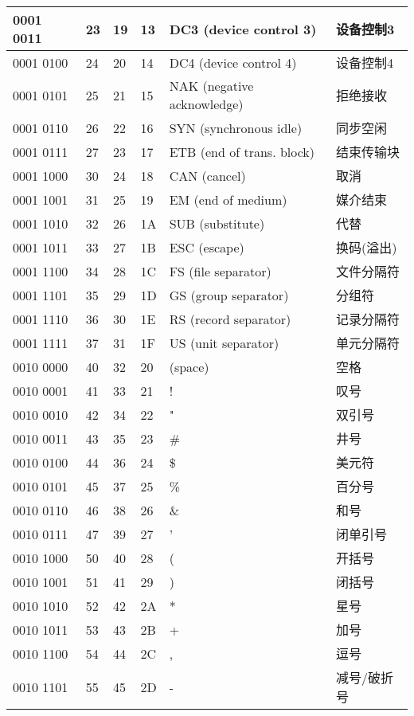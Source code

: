 \begin{longtable}{| p{.10\linewidth} | p{.08\linewidth} | p{.08\linewidth} | p{.10\linewidth} | p{.28\linewidth} | p{.15\linewidth} |}
0001 0011 & 23 & 19 & 13 & DC3 (device control 3) & 设备控制3 \\ \hline
0001 0100 & 24 & 20 & 14 & DC4 (device control 4) & 设备控制4 \\ \hline
0001 0101 & 25 & 21 & 15 & NAK (negative acknowledge) & 拒绝接收 \\ \hline
0001 0110 & 26 & 22 & 16 & SYN (synchronous idle) & 同步空闲 \\ \hline
0001 0111 & 27 & 23 & 17 & ETB (end of trans. block) & 结束传输块 \\ \hline
0001 1000 & 30 & 24 & 18 & CAN (cancel) & 取消 \\ \hline
0001 1001 & 31 & 25 & 19 & EM (end of medium) & 媒介结束 \\ \hline
0001 1010 & 32 & 26 & 1A & SUB (substitute) & 代替 \\ \hline
0001 1011 & 33 & 27 & 1B & ESC (escape) & 换码(溢出) \\ \hline
0001 1100 & 34 & 28 & 1C & FS (file separator) & 文件分隔符 \\ \hline
0001 1101 & 35 & 29 & 1D & GS (group separator) & 分组符 \\ \hline
0001 1110 & 36 & 30 & 1E & RS (record separator) & 记录分隔符 \\ \hline
0001 1111 & 37 & 31 & 1F & US (unit separator) & 单元分隔符 \\ \hline
0010 0000 & 40 & 32 & 20 & (space) & 空格 \\ \hline
0010 0001 & 41 & 33 & 21 & ! & 叹号 \\ \hline
0010 0010 & 42 & 34 & 22 & " & 双引号 \\ \hline
0010 0011 & 43 & 35 & 23 & \# & 井号 \\ \hline
0010 0100 & 44 & 36 & 24 & \$ & 美元符 \\ \hline
0010 0101 & 45 & 37 & 25 & \% & 百分号 \\ \hline
0010 0110 & 46 & 38 & 26 & \& & 和号 \\ \hline
0010 0111 & 47 & 39 & 27 & ' & 闭单引号 \\ \hline
0010 1000 & 50 & 40 & 28 & ( & 开括号 \\ \hline
0010 1001 & 51 & 41 & 29 &) & 闭括号 \\ \hline
0010 1010 & 52 & 42 & 2A & * & 星号 \\ \hline
0010 1011 & 53 & 43 & 2B & + & 加号 \\ \hline
0010 1100 & 54 & 44 & 2C & , & 逗号 \\ \hline
0010 1101 & 55 & 45 & 2D & - & 减号/破折号 \\ \hline

\end{longtable}
